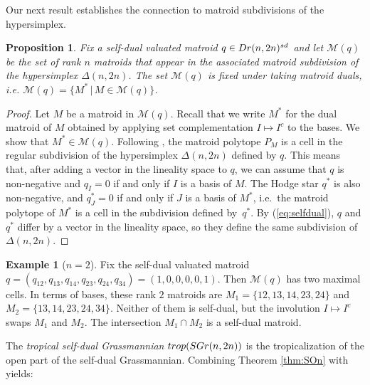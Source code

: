 \documentclass[12pt]{extarticle}
\newtheorem{proposition}[theorem]{Proposition}
\theoremstyle{definition}
\newtheorem{example}[theorem]{Example}
\numberwithin{theorem}{section}
\theoremstyle{plain}\newtheorem{ithm}{Theorem}
\begin{document}
Our next result establishes the connection to matroid subdivisions of the hypersimplex.
  
  \begin{proposition} \label{prop:involution}
    Fix a self-dual valuated matroid $q \in {\rm Dr}(n,2n)^{\rm sd}$ 
    and let $\mathcal{M}(q)$ be the set of rank $n$ matroids
    that appear  in the associated matroid subdivision of the hypersimplex $\Delta(n,2n)$. 
    The set $\mathcal{M}(q)$ is fixed under taking matroid duals, i.e. $\mathcal{M}(q)=\{M^* \,|\, M \in \mathcal{M}(q)\}$. %
  \end{proposition}
  
  \begin{proof}
    Let $M$ be a matroid in $\mathcal{M}(q)$. Recall that we write $M^*$ for the dual matroid of $M$ obtained by applying set complementation $I \mapsto I^c$ to the bases. We show that
    $M^* \in \mathcal{M}(q)$. 
    Following \cite[Lemma 4.4.6]{MS}, the matroid polytope $P_M$ is
    a cell in the regular %
    subdivision of  the hypersimplex $\Delta(n,2n)$ defined by $q$.
    This means that, after adding a vector in the lineality space to $q$, we can assume that
    $q$ is non-negative and $q_I = 0$ if and only if $I$ is a basis of $M$.
    The Hodge star $q^*$  is also non-negative, and $q^*_J = 0$ if and only if $J $ is a basis of $M^*$, 
    i.e.~the matroid polytope of $M^*$ is a cell in the subdivision defined by~$q^*$.
    By (\ref{eq:selfdual}), $q$ and $q^*$ differ by a vector in the lineality space, 
    so they define the same %
    subdivision of $\Delta(n,2n)$.
  \end{proof}
  
  \begin{example}[$n=2$]
    Fix the self-dual valuated matroid $q = (q_{12} ,q_{13},q_{14},q_{23},q_{24},q_{34}) = (1,0,0,0,0,1)$.
    Then $\mathcal{M}(q)$ has two maximal cells.
        In terms of bases, these rank $2$ matroids are
        $M_1=\{12,13,14,23,24\}$ and $M_2=\{13,14,23,24,34\}$. Neither of them is self-dual, but
    the involution $I \mapsto I^c$ swaps $M_1$ and $M_2$. 
    The intersection $M_1 \cap M_2$ is a self-dual matroid.
  \end{example}
  
  The {\em tropical self-dual Grassmannian} ${\rm trop}({\rm SGr}(n,2n))$ is the tropicalization of the open part of the self-dual Grassmannian.   
  Combining Theorem \ref{thm:SOn} with \cite[Theorem 3.3.5]{MS} yields:
    
\end{document}
